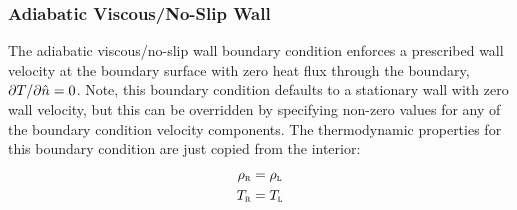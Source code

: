 \subsubsection{Adiabatic Viscous\slash No-Slip Wall}
\label{SEC:BC:Wall:Adiabatic}

The adiabatic viscous\slash no-slip wall boundary condition enforces a
prescribed wall velocity at the boundary surface with zero heat flux through the
boundary, \thatis $\partial T/\partial \hat{n} = 0$.
%
Note, this boundary condition defaults to a stationary wall with zero wall
velocity, but this can be overridden by specifying non-zero values for any of
the boundary condition velocity components.
%
The thermodynamic properties for this boundary condition are just copied from
the interior:
%
\begin{alignat*}{1}
  \rho_{\textsc{r}} & = \rho_{\textsc{l}} \\
  T_{\textsc{r}} & = T_{\textsc{l}}
\end{alignat*}


